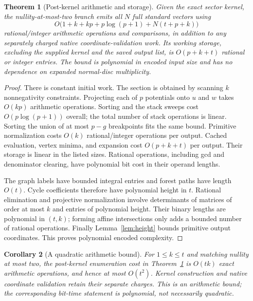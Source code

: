 \documentclass[11pt]{article}
\newtheorem{theorem}{Theorem}[section]
\newtheorem{corollary}[theorem]{Corollary}
\theoremstyle{definition}
\theoremstyle{remark}
\begin{document}
\begin{theorem}[Post-kernel arithmetic and storage]
\label{thm:cost}
Given the exact sector kernel, the nullity-at-most-two branch emits all $N$
full standard vectors using
\begin{equation}
 O\bigl(1+k+kp+p\log(p+1)+N(t+p+k)\bigr)
 \label{eq:cost}
\end{equation}
rational/integer arithmetic operations and comparisons, in addition to any separately
charged native coordinate-validation work. Its working storage, excluding
the supplied kernel and the saved output list, is $O(p+k+t)$ rational or
integer entries. The bound is polynomial in encoded input size and has no
dependence on expanded normal-disc multiplicity.
\end{theorem}

\begin{proof}
There is constant initial work. The section is obtained by scanning $k$
nonnegativity constraints. Projecting
each of $p$ potentials onto $u$ and $w$ takes $O(kp)$ arithmetic operations.
Sorting and the stack sweeps cost $O(p\log(p+1))$ overall; the total number of
stack operations is linear. Sorting the union of at most $p-g$ breakpoints
fits the same bound. Primitive normalization costs $O(k)$ rational/integer
operations per output. Cached evaluation, vertex minima, and expansion cost
$O(p+k+t)$ per output. Their storage is linear in the listed sizes. Rational
operations, including gcd and denominator clearing, have polynomial bit cost
in their operand lengths.

The graph labels have bounded integral entries and forest paths have length
$O(t)$. Cycle coefficients therefore have polynomial height in $t$. Rational
elimination and projective normalization involve determinants of matrices of
order at most $k$ and entries of polynomial height. Their binary lengths are
polynomial in $(t,k)$; forming affine intersections only adds a bounded
number of rational operations. Finally Lemma~\ref{lem:height} bounds primitive
output coordinates. This proves polynomial encoded complexity.
\end{proof}

\begin{corollary}[A quadratic arithmetic bound]
\label{cor:quadratic}
For $1\le k\le t$ and matching nullity at most two, the post-kernel
enumeration cost in Theorem~\ref{thm:cost} is $O(tk)$ exact arithmetic
operations, and hence at most $O(t^2)$. Kernel construction and native
coordinate validation retain their separate charges. This is an arithmetic
bound; the corresponding bit-time statement is polynomial, not necessarily
quadratic.
\end{corollary}
\end{document}
